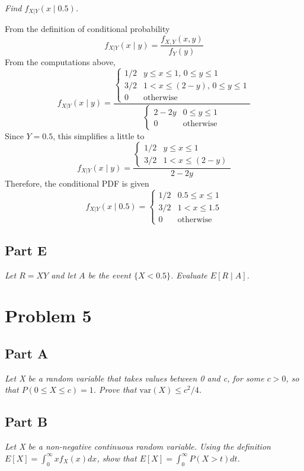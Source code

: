 \documentclass{article}
\begin{document}
\textit{Find $ f_{X|Y}(x \mid 0.5) $.}

\bigbreak

From the definition of conditional probability
$$ f_{X|Y}(x \mid y) = \frac{f_{X,Y}(x,y)}{f_Y(y)} $$
From the computations above,
$$ f_{X|Y}(x \mid y) = \frac{\begin{cases}
    1/2 & y \leq x \leq 1,\, 0 \leq y \leq 1 \\
    3/2 & 1 < x \leq (2 - y),\, 0 \leq y \leq 1 \\
    0 & \mathrm{otherwise}
\end{cases}}{\begin{cases}
    2 - 2y & 0 \leq y \leq 1 \\
    0 & \mathrm{otherwise}
\end{cases}} $$
Since $Y = 0.5$, this simplifies a little to
$$ f_{X|Y}(x \mid y) = \frac{\begin{cases}
    1/2 & y \leq x \leq 1 \\
    3/2 & 1 < x \leq (2 - y)
\end{cases}}{2 - 2y} $$
Therefore, the conditional PDF is given
$$ f_{X|Y}(x \mid 0.5) = \begin{cases}
    1/2 & 0.5 \leq x \leq 1 \\
    3/2 & 1 < x \leq 1.5 \\
    0 & \mathrm{otherwise}
\end{cases} $$

\subsection*{Part E}

\textit{Let $ R = XY $ and let $A$ be the event $ \{ X < 0.5 \} $. Evaluate $
E[R \mid A] $.}

\section*{Problem 5}

\subsection*{Part A}

\textit{Let X be a random variable that takes values between 0 and c, for
some $ c > 0 $, so that $P(0 \leq X \leq c) = 1$. Prove that $\mathrm{var}(X)
\leq c^2/4$.}

\subsection*{Part B}

\textit{Let X be a non-negative continuous random variable. Using the
definition $E[X] = \int_0^{\infty} x f_X(x) dx $, show that $ E[X] =
\int_0^{\infty} P(X > t) dt $.}
\end{document}
